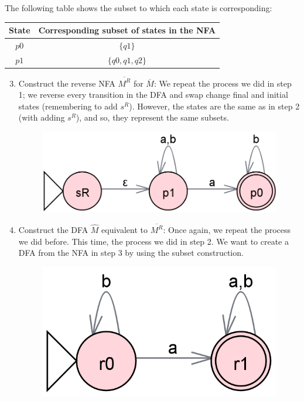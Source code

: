 \documentclass[12pt]{article}
\begin{document}
The following table shows the subset to which each state is corresponding:

\begin{center}
\begin{tabular}{|c|c|}
    \hline
    State & Corresponding subset of states in the NFA \\
    \hline
    $p0$ & $\{q1\}$ \\
    $p1$ & $\{q0, q1, q2\}$ \\
    \hline
\end{tabular}
\end{center}

\begin{enumerate}
    \setcounter{enumi}{2}
    \item Construct the reverse NFA $\overline{M^R}$ for $\overline{M}$: We repeat the process we did in step 1; we reverse every transition in the DFA and swap change final and initial states (remembering to add $s^R$). However, the states are the same as in step 2 (with adding $s^R$), and so, they represent the same subsets.

\begin{figure}[h]
        \centering
        \includegraphics[width=0.7\linewidth]{First_Automaton_Third_Step.png}
\end{figure}
\bigskip\bigskip\bigskip\bigskip\bigskip\bigskip\bigskip\bigskip\bigskip

    \item Construct the DFA $\widehat{M}$ equivalent to $\overline{M^R}$: Once again, we repeat the process we did before. This time, the process we did in step 2. We want to create a DFA from the NFA in step 3 by using the subset construction.
    
\begin{figure}[h]
        \centering
        \includegraphics[width=0.5\linewidth]{First_Automaton_Fourth_Step.png}
\end{figure}

\end{enumerate}
\end{document}
